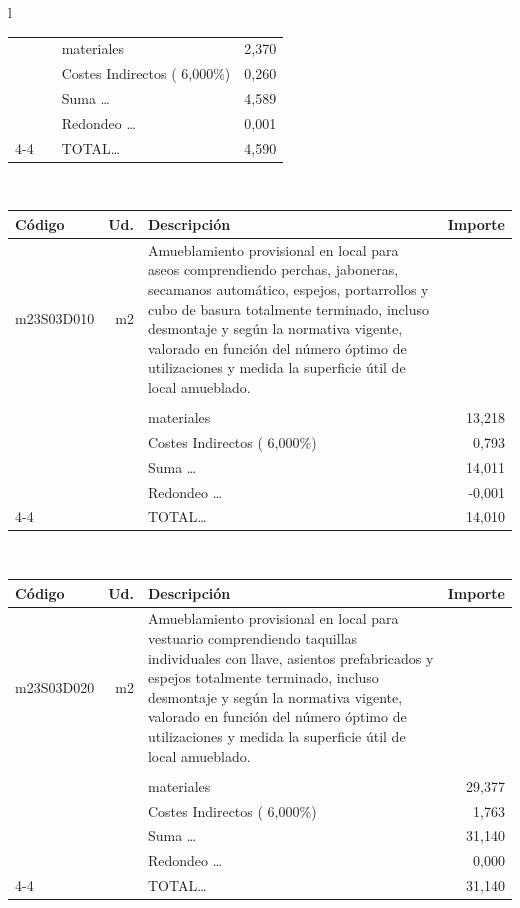 \documentclass{book}%
\begin{document}
\begin{longtable}{l}
\begin{tabular}{l r p{60mm} r}
&&materiales&     2,370\\%
&&Costes Indirectos (     6,000\%)&     0,260\\%
&&Suma \ldots&     4,589\\%
&&Redondeo \ldots&     0,001\\%
\cline{4-4}%
&&TOTAL\ldots&     4,590\\%
\end{tabular}\\%
\begin{tabular}{l r p{60mm} r}%
Código&Ud.&Descripción&Importe\\%
\hline%
m23S03D010&m2&Amueblamiento provisional en local para aseos comprendiendo perchas, jaboneras, secamanos automático, espejos, portarrollos y cubo de basura totalmente terminado, incluso desmontaje y según la normativa vigente, valorado en función del número óptimo de utilizaciones y medida la superficie útil de local amueblado.&\\%
&&&\\%
&&materiales&    13,218\\%
&&Costes Indirectos (     6,000\%)&     0,793\\%
&&Suma \ldots&    14,011\\%
&&Redondeo \ldots&    {-}0,001\\%
\cline{4-4}%
&&TOTAL\ldots&    14,010\\%
\end{tabular}\\%
\begin{tabular}{l r p{60mm} r}%
Código&Ud.&Descripción&Importe\\%
\hline%
m23S03D020&m2&Amueblamiento provisional en local para vestuario comprendiendo taquillas individuales con llave, asientos prefabricados y espejos totalmente terminado, incluso desmontaje y según la normativa vigente, valorado en función del número óptimo de utilizaciones y medida la superficie útil de local amueblado.&\\%
&&&\\%
&&materiales&    29,377\\%
&&Costes Indirectos (     6,000\%)&     1,763\\%
&&Suma \ldots&    31,140\\%
&&Redondeo \ldots&     0,000\\%
\cline{4-4}%
&&TOTAL\ldots&    31,140\\%
\end{tabular}\\%
\begin{tabular}{l r p{60mm} r}%

\end{tabular}
\end{longtable}
\end{document}

